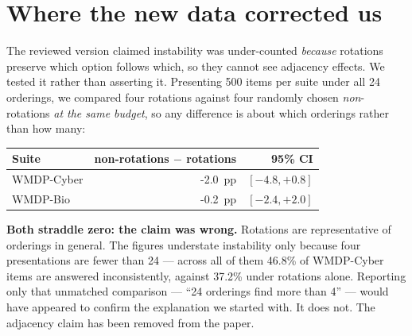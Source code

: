 \documentclass[11pt,a4paper]{article}
\newcommand{\key}[1]{\textcolor{hl}{\textbf{#1}}}
\begin{document}
\section{Where the new data corrected us}
The reviewed version claimed instability was under-counted \emph{because} rotations preserve which option follows which, so they cannot see adjacency effects. We tested it rather than asserting it.
Presenting 500 items per suite under all 24 orderings, we compared four rotations against four randomly chosen \emph{non}-rotations \emph{at the same budget}, so any difference is about which orderings rather than how many:
\begin{center}\small\begin{tabular}{@{}lrr@{}}
\toprule
Suite & non-rotations $-$ rotations & 95\% CI \\
\midrule
WMDP-Cyber & -2.0~pp & $[-4.8, +0.8]$ \\
WMDP-Bio & -0.2~pp & $[-2.4, +2.0]$ \\
\bottomrule\end{tabular}\end{center}
\key{Both straddle zero: the claim was wrong.} Rotations are representative of orderings in general. The figures understate instability only because four presentations are fewer than 24 --- across all of them 46.8\% of WMDP-Cyber items are answered inconsistently, against 37.2\% under rotations alone.
Reporting only that unmatched comparison --- ``24 orderings find more than 4'' --- would have appeared to confirm the explanation we started with. It does not. The adjacency claim has been removed from the paper.
\end{document}
